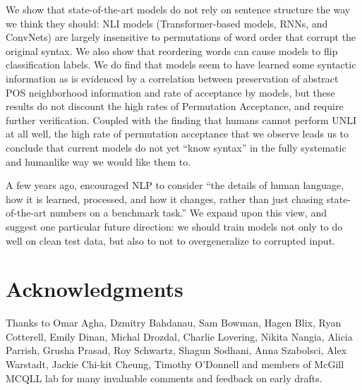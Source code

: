 \documentclass[11pt,a4paper]{article}
\newcommand{\PermAcc}{Permutation Acceptance} %
\begin{document}
We show that state-of-the-art models do not rely on sentence structure the way we think they should: NLI models (Transformer-based models, RNNs, and ConvNets) are largely insensitive to permutations of word order that corrupt the original syntax. %
We also show that reordering words can cause models to flip classification labels. %
We do find that models seem to have learned some syntactic information as is evidenced by a correlation between preservation of abstract POS neighborhood information and rate of acceptance by models, but these results do not discount the high rates of \PermAcc, and require further verification. Coupled with the finding that humans cannot perform UNLI at all well, the high rate of permutation acceptance that we observe leads us to conclude that current models do not yet ``know syntax'' in the fully systematic and humanlike way we would like them to. 


A few years ago,  encouraged NLP to consider ``the details of human language, how it is learned, processed, and how it changes, rather than just chasing state-of-the-art numbers on a benchmark task.'' We expand upon this view, and suggest one particular future direction: we should train models not only to do well on clean test data, but also to not to overgeneralize to corrupted input. %


\section*{Acknowledgments}

Thanks to Omar Agha, Dzmitry Bahdanau, Sam Bowman, Hagen Blix, Ryan Cotterell, Emily Dinan, Michal Drozdal, Charlie Lovering, Nikita Nangia, Alicia Parrish, Grusha Prasad, Roy Schwartz, Shagun Sodhani, Anna Szabolsci, Alex Warstadt, Jackie Chi-kit Cheung, Timothy O'Donnell and members of McGill MCQLL lab for many invaluable comments and feedback on early drafts. 
\end{document}
